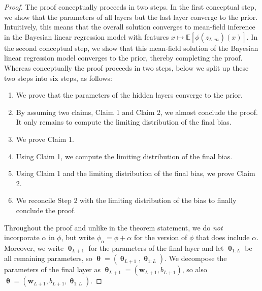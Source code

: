 \documentclass[twoside]{article}
\newcommand{\vw}{\mathbf{w}}
\newcommand{\vtheta}{\bm{\uptheta}}
\newcommand{\E}{\mathbb{E}}
\theoremstyle{theoremstyle}
\begin{document}
\begin{proof}
    The proof conceptually proceeds in two steps.
    In the first conceptual step, we show that the parameters of all layers but the last layer converge to the prior.
    Intuitively, this means that the overall solution converges to mean-field inference in the Bayesian linear regression model with features $x \mapsto \E[\phi(z_{L,m})(x)]$.
    In the second conceptual step, we show that this mean-field solution of the Bayesian linear regression model converges to the prior, thereby completing the proof.
    Whereas conceptually the proof proceeds in two steps, below we split up these two steps into six steps, as follows:
    \begin{enumerate}[leftmargin=5em]
        \item[Step 1:] We prove that the parameters of the hidden layers converge to the prior.
        \item[Step 2:] By assuming two claims, Claim 1 and Claim 2, we almost conclude the proof. It only remains to compute the limiting distribution of the final bias.
        \item[Step 3:] We prove Claim 1.
        \item[Step 4:] Using Claim 1, we compute the limiting distribution of the final bias.
        \item[Step 5:] Using Claim 1 and the limiting distribution of the final bias, we prove Claim 2.
        \item[Step 6:] We reconcile Step 2 with the limiting distribution of the bias to finally conclude the proof.
    \end{enumerate}
    
    Throughout the proof and unlike in the theorem statement, we do \emph{not} incorporate $\alpha$ in $\phi$, but write $\phi_\alpha = \phi + \alpha$ for the version of $\phi$ that does include $\alpha$.
    Moreover, we write $\vtheta_{L+1}$ for the parameters of the final layer and let $\vtheta_{1:L}$ be all remaining parameters, so $\vtheta = (\vtheta_{L+1}, \vtheta_{1:L})$.
    We decompose the parameters of the final layer as $\vtheta_{L+1} = (\vw_{L+1}, b_{L+1})$, so also $\vtheta = (\vw_{L+1}, b_{L+1}, \vtheta_{1:L})$.
    

\end{proof}
\end{document}
